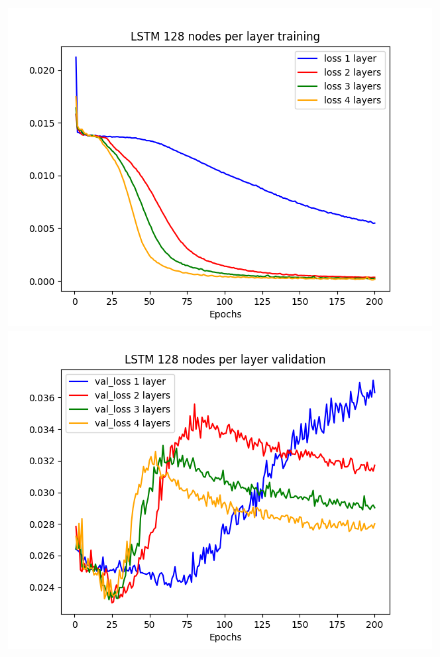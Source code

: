 \documentclass[11pt]
{article}
\begin{document}
\begin{figure}[ht]
	\begin{minipage}[b]{0.33\linewidth}
		\centering
		\includegraphics[width=\linewidth]{../TESTS_RESULTS/LSTM_tests/plots/128_training.png} 
	\end{minipage}%
	\begin{minipage}[b]{0.33\linewidth}
		\centering
		\includegraphics[width=\linewidth]{../TESTS_RESULTS/LSTM_tests/plots/128_validation.png} 
	\end{minipage} 
\hspace*{-2cm}  
	\begin{minipage}[b]{0.33\linewidth}
		\centering

\end{minipage}
\end{figure}
\end{document}
